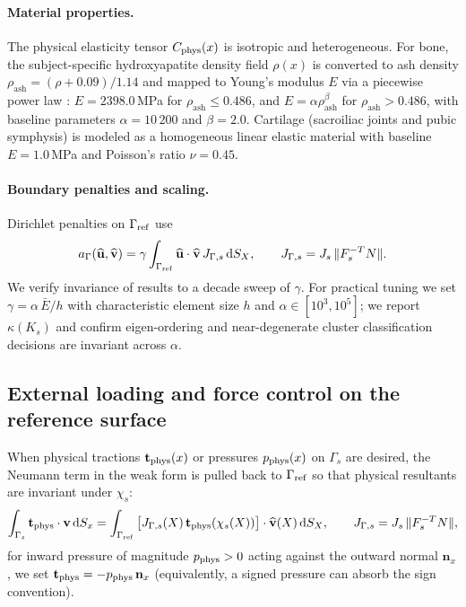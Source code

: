 \documentclass[11pt]{article}
\begin{document}
\paragraph{Material properties.}
The physical elasticity tensor $C_{\rm phys}(x)$ is isotropic and heterogeneous. For bone, the subject-specific hydroxyapatite density field $\rho(x)$ is converted to ash density $\rho_{\mathrm{ash}} = (\rho + 0.09) / 1.14$ and mapped to Young's modulus $E$ via a piecewise power law \citep{Keller1994}: $E = 2398.0$\,MPa for $\rho_{\mathrm{ash}} \le 0.486$, and $E = \alpha \rho_{\mathrm{ash}}^\beta$ for $\rho_{\mathrm{ash}} > 0.486$, with baseline parameters $\alpha=10\,200$ and $\beta=2.0$. Cartilage (sacroiliac joints and pubic symphysis) is modeled as a homogeneous linear elastic material with baseline $E=1.0$\,MPa and Poisson's ratio $\nu=0.45$.

\paragraph{Boundary penalties and scaling.}
Dirichlet penalties on $\Gamma_{\rm ref}$ use
\begin{equation}
a_\Gamma(\widehat{\mathbf u},\widehat{\mathbf v})
=\gamma\int_{\Gamma_{\rm ref}} \widehat{\mathbf u}\cdot \widehat{\mathbf v}\,J_{\Gamma,s}\,\mathrm dS_X,
\qquad J_{\Gamma,s}=J_s\,\|F_s^{-T}N\|.
\end{equation}
We verify invariance of results to a decade sweep of $\gamma$.
For practical tuning we set $\gamma=\alpha\,\bar E/h$ with characteristic element size $h$ and $\alpha\in[10^3,10^5]$; we report $\kappa(K_s)$ and confirm eigen-ordering and near-degenerate cluster classification decisions are invariant across $\alpha$.

\subsection{External loading and force control on the reference surface}
\label{sec:loading}
When physical tractions $\mathbf t_{\rm phys}(x)$ or pressures $p_{\rm phys}(x)$ on $\Gamma_s$ are desired, the Neumann term in the weak form is pulled back to $\Gamma_{\rm ref}$ so that physical resultants are invariant under $\chi_s$:
\begin{equation}
\int_{\Gamma_s}\mathbf t_{\rm phys}\cdot \mathbf v\,\mathrm dS_x
=\int_{\Gamma_{\rm ref}} \big[J_{\Gamma,s}(X)\,\mathbf t_{\rm phys}(\chi_s(X))\big]\cdot \widehat{\mathbf v}(X)\,\mathrm dS_X,
\qquad J_{\Gamma,s}=J_s\,\|F_s^{-T}N\|,
\label{eq:neumann-pullback}
\end{equation}
for inward pressure of magnitude $p_{\rm phys}>0$ acting against the outward normal $\mathbf n_x$, we set $\mathbf t_{\rm phys}=-p_{\rm phys}\,\mathbf n_x$ (equivalently, a signed pressure can absorb the sign convention). 
\end{document}
